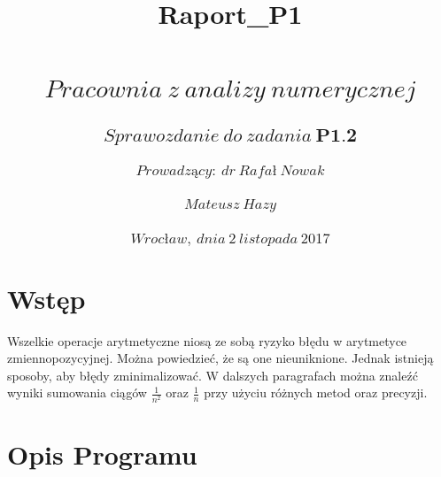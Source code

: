 \documentclass[11pt]{article}
\title{Raport\_P1}
\begin{document}
    
    
    \maketitle
    
    

    
    \section{\[ Pracownia \ z \ analizy \ numerycznej \]}\label{pracownia-z-analizy-numerycznej}

    \subsection{\[ Sprawozdanie \ do \ zadania \ \textbf{P1.2} \]}\label{sprawozdanie-do-zadania-textbfp1.2}

\subsubsection{\[ Prowadzący: \ dr \ Rafał \ Nowak \]}\label{prowadzux105cy-dr-rafaux142-nowak}

\subsubsection{\[ Mateusz \ Hazy \]}\label{mateusz-hazy}

\subsubsection{\[ Wrocław, \ dnia \ 2 \ listopada \ 2017 \]}\label{wrocux142aw-dnia-2-listopada-2017}

    \section{Wstęp}\label{wstux119p}

    Wszelkie operacje arytmetyczne niosą ze sobą ryzyko błędu w arytmetyce
zmiennopozycyjnej. Można powiedzieć, że są one nieuniknione. Jednak
istnieją sposoby, aby błędy zminimalizować. W dalszych paragrafach można
znaleźć wyniki sumowania ciągów $\frac{1}{n^2}$ oraz $\frac{1}{n}$ przy
użyciu różnych metod oraz precyzji.

    \section{Opis Programu}\label{opis-programu}
\end{document}

